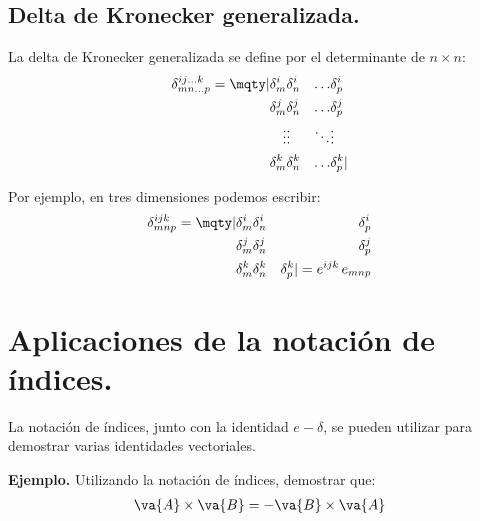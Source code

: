 \subsection*{Delta de Kronecker generalizada.}

La delta de Kronecker generalizada se define por el determinante de $n \times n$:
\begin{align*}
\delta_{m n \ldots p}^{i j \ldots k} = \mqty|
\delta_{m}^{i} & \delta_{n}^{i} & \ldots & \delta_{p}^{i} \\
\delta_{m}^{j} & \delta_{n}^{j} & \ldots & \delta_{p}^{j} \\
\vdots & \vdots & \ddots & \vdots \\
\delta_{m}^{k} & \delta_{n}^{k} & \ldots & \delta_{p}^{k} |
\end{align*}

Por ejemplo, en tres dimensiones podemos escribir:
\begin{align*}
\delta_{m n p}^{i j k} = \mqty|
\delta_{m}^{i} & \delta_{n}^{i} & \delta_{p}^{i} \\
\delta_{m}^{j} & \delta_{n}^{j} & \delta_{p}^{j} \\
\delta_{m}^{k} & \delta_{n}^{k} & \delta_{p}^{k}| =
e^{ijk} \, e_{mnp}
\end{align*}

\section{Aplicaciones de la notación de índices.}

La notación de índices, junto con la identidad $e-\delta$, se pueden utilizar para demostrar varias identidades vectoriales.
\par
\textbf{Ejemplo.} Utilizando la notación de índices, demostrar que: 
\begin{align*}
\va{A} \times \va{B} = - \va{B} \times \va{A}
\end{align*}

